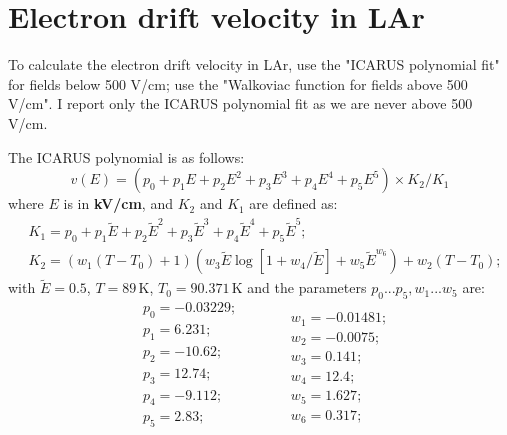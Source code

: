 \section{Electron drift velocity in LAr}
To calculate the electron drift velocity in LAr, use the "ICARUS polynomial fit" for fields below 500 V/cm; use the "Walkoviac function for fields above 500 V/cm". I report only the ICARUS polynomial fit as we are never above 500 V/cm.

The ICARUS polynomial is as follows:
\begin{equation}
v(E) = (p_0 + p_1 E + p_2 E^2 + p_3 E^3 + 
    p_4 E^4 + p_5 E^5) \times K_2/K_1
\end{equation}  
where $E$ is in \textbf{kV/cm}, and $K_2$ and $K_1$ are defined as:
\begin{align}
& K_1 = p_0 + p_1 \widetilde{E} + p_2 \widetilde{E}^2 + p_3 \widetilde{E}^3 + 
   p_4 \widetilde{E}^4 + p_5 \widetilde{E}^5;\\
&K_2 = \left(w_1 (T - T_0) + 1\right) \left(w_3 \widetilde{E} \log[1 + w_4/\widetilde{E}] + w_5 \widetilde{E}^{w_6}\right) + 
   w_2 (T - T_0);
\end{align}
with $\widetilde{E} = 0.5$, $T=89$\,K, $T_0 = 90.371$\,K and the parameters $p_0 ... p_5, w_1...w_5 $ are:
\begin{equation}
\begin{aligned}
&p_0 = -0.03229;\\
&p_1 = 6.231;\\
&p_2 = -10.62;\\
&p_3 = 12.74;\\
&p_4 = -9.112;\\
&p_5 = 2.83;\\
\end{aligned}
\;\;\;\;\;\;\;\;
\begin{aligned}
&w_1 = -0.01481;\\
&w_2 = -0.0075;\\
&w_3 = 0.141;\\
&w_4 = 12.4;\\
&w_5 = 1.627;\\
&w_6 = 0.317;
\end{aligned}
\end{equation} 


